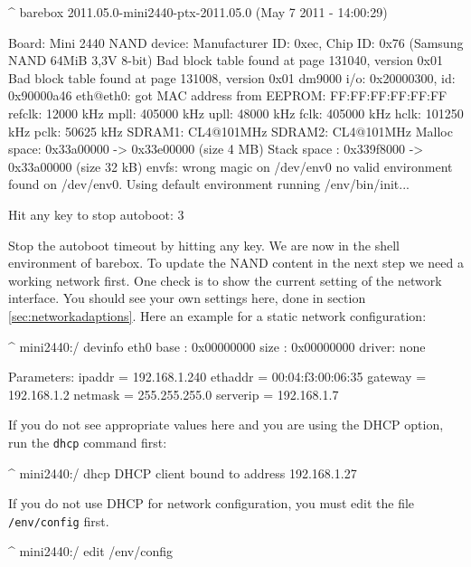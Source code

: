 \begin{ptxshell}[escapechar=|]{^}
barebox 2011.05.0-mini2440-ptx-2011.05.0 (May 7 2011 - 14:00:29)

Board: Mini 2440
NAND device: Manufacturer ID: 0xec, Chip ID: 0x76 (Samsung NAND 64MiB 3,3V 8-bit)
Bad block table found at page 131040, version 0x01
Bad block table found at page 131008, version 0x01
dm9000 i/o: 0x20000300, id: 0x90000a46
eth@eth0: got MAC address from EEPROM: FF:FF:FF:FF:FF:FF
refclk:    12000 kHz
mpll:     405000 kHz
upll:      48000 kHz
fclk:     405000 kHz
hclk:     101250 kHz
pclk:      50625 kHz
SDRAM1:   CL4@101MHz
SDRAM2:   CL4@101MHz
Malloc space: 0x33a00000 -> 0x33e00000 (size  4 MB)
Stack space : 0x339f8000 -> 0x33a00000 (size 32 kB)
envfs: wrong magic on /dev/env0
no valid environment found on /dev/env0. Using default environment
running /env/bin/init...

Hit any key to stop autoboot:  3
\end{ptxshell}

Stop the autoboot timeout by hitting any key. We are now in the shell
environment of barebox. To update the NAND content in the next step we need
a working network first. One check is to show the current setting of the
network interface. You should see your own settings here, done in section
\ref{sec:networkadaptions}. Here an example for a static network configuration:

\begin{ptxshell}[escapechar=|]{^}
mini2440:/ devinfo eth0
base  : 0x00000000
size  : 0x00000000
driver: none

Parameters:
          ipaddr = 192.168.1.240
         ethaddr = 00:04:f3:00:06:35
         gateway = 192.168.1.2
         netmask = 255.255.255.0
        serverip = 192.168.1.7
\end{ptxshell}

If you do not see appropriate values here and you are using the DHCP option, run
the \texttt{dhcp} command first:

\begin{ptxshell}[escapechar=|]{^}
mini2440:/ dhcp
DHCP client bound to address 192.168.1.27
\end{ptxshell}

If you do not use DHCP for network configuration, you must edit the file
\texttt{/env/config} first.

\begin{ptxshell}[escapechar=|]{^}
mini2440:/ edit /env/config
\end{ptxshell}

